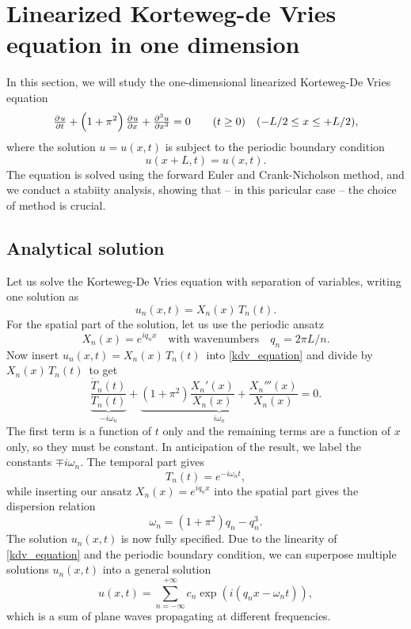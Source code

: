 \section{Linearized Korteweg-de Vries equation in one dimension}

In this section, we will study the one-dimensional linearized Korteweg-De Vries equation
\begin{equation}
\pd{u}{t} + \left(1+\pi^2\right)\pd{u}{x} + \pd[3]{u}{x} = 0 \qquad (t \geq 0) \quad (-L/2 \leq x \leq +L/2),
\label{kdv_equation}
\end{equation}
where the solution $u = u(x,t)$ is subject to the periodic boundary condition
\begin{equation}
u(x+L, t) = u(x, t).
\label{ex5:eq:boundary_conditions}
\end{equation}
The equation is solved using the forward Euler and Crank-Nicholson method, and we conduct a stabiity analysis, showing that -- in this paricular case -- the choice of method is crucial.

\subsection{Analytical solution}

Let us solve the Korteweg-De Vries equation with separation of variables, writing one solution as
\begin{equation*}
	u_n(x,t) = X_n(x) \, T_n(t).
\end{equation*}
For the spatial part of the solution, let us use the periodic ansatz
\begin{equation*}
	X_n(x) = e^{i q_n x} \quad \text{with wavenumbers} \quad q_n = 2 \pi L / n.
\end{equation*}
Now insert $u_n(x,t) = X_n(x) \, T_n(t)$ into \cref{kdv_equation} and divide by $X_n(x) \, T_n(t)$ to get
\begin{equation*}
	\underbrace{\frac{\dot{T}_n(t)}{T_n(t)}}_{-i \omega_n} + \underbrace{\left( 1 + \pi^2 \right) \frac{X_n'(x)}{X_n(x)} + \frac{X_n'''(x)}{X_n(x)}}_{i \omega_n} = 0.
\end{equation*}
The first term is a function of $t$ only and the remaining terms are a function of $x$ only, so they must be constant.
In anticipation of the result, we label the constants $\mp i \omega_n$.
The temporal part gives
\begin{equation*}
	T_n(t) = e^{-i \omega_n t},
\end{equation*}
while inserting our ansatz $X_n(x) = e^{i q_n x}$ into the spatial part gives the dispersion relation
\begin{equation*}
	\omega_n = (1 + \pi^2) q_n - q_n^3.
\end{equation*}
The solution $u_n(x,t)$ is now fully specified.
Due to the linearity of \cref{kdv_equation} and the periodic boundary condition, we can superpose multiple solutions $u_n(x,t)$ into a general solution
\begin{equation}
	u(x,t) = \sum_{n=-\infty}^{+\infty} c_n \exp{\left( i(q_n x - \omega_n t) \right)},
	\label{fourier_series}
\end{equation}
which is a sum of plane waves propagating at different frequencies.

